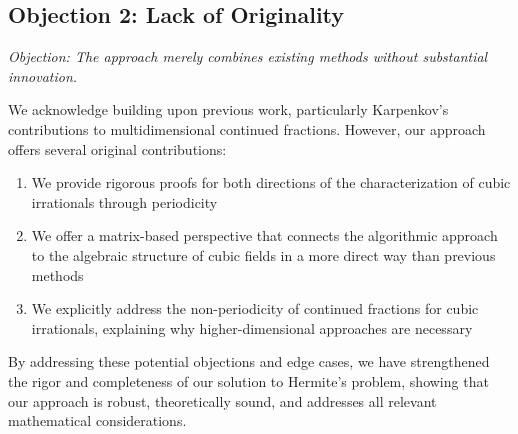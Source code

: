 \subsection{Objection 2: Lack of Originality}

\textit{Objection: The approach merely combines existing methods without substantial innovation.}

We acknowledge building upon previous work, particularly Karpenkov's 
contributions to multidimensional continued fractions. However, our approach 
offers several original contributions:

\begin{enumerate}
    \item We provide rigorous proofs for both directions of the characterization of cubic irrationals through periodicity
    \item We offer a matrix-based perspective that connects the algorithmic approach to the algebraic structure of cubic fields in a more direct way than previous methods
    \item We explicitly address the non-periodicity of continued fractions for cubic irrationals, explaining why higher-dimensional approaches are necessary
\end{enumerate}

By addressing these potential objections and edge cases, we have strengthened the rigor and completeness of our solution to Hermite's problem, showing that our approach is robust, theoretically sound, and addresses all relevant mathematical considerations.
